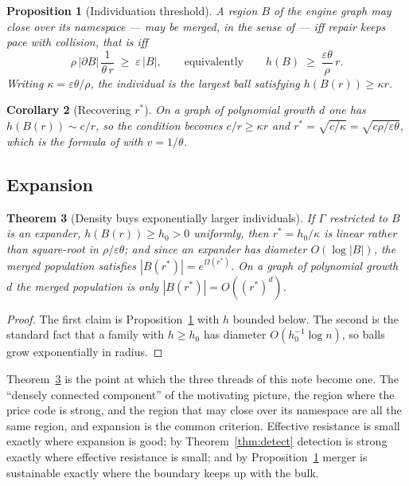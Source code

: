 \documentclass[11pt]{article}
\theoremstyle{plain}
\newtheorem{theorem}{Theorem}[section]
\newtheorem{proposition}[theorem]{Proposition}
\newtheorem{corollary}[theorem]{Corollary}
\theoremstyle{definition}
\theoremstyle{remark}
\begin{document}
\begin{proposition}[Individuation threshold]\label{prop:indiv}
A region $B$ of the engine graph may close over its namespace --- may be
merged, in the sense of \cite[\S8]{compose} --- iff repair keeps pace with
collision, that is iff
\[
  \rho\,|\partial B|\,\frac{1}{\theta\,r} \;\geq\; \varepsilon\,|B|,
  \qquad\text{equivalently}\qquad
  h(B) \;\geq\; \frac{\varepsilon\theta}{\rho}\, r .
\]
Writing $\kappa = \varepsilon\theta/\rho$, the individual is the largest
ball satisfying $h(B(r)) \geq \kappa r$.
\end{proposition}

\begin{corollary}[Recovering $r^\ast$]
On a graph of polynomial growth $d$ one has $h(B(r)) \sim c/r$, so the
condition becomes $c/r \geq \kappa r$ and
$r^\ast = \sqrt{c/\kappa} = \sqrt{c\rho/\varepsilon\theta}$, which is the
formula of \cite{compaut} with $v = 1/\theta$.
\end{corollary}

\subsection{Expansion}

\begin{theorem}[Density buys exponentially larger individuals]
\label{thm:expander}
If $\Gamma$ restricted to $B$ is an expander, $h(B(r)) \geq h_0 > 0$
uniformly, then $r^\ast = h_0/\kappa$ is linear rather than square-root in
$\rho/\varepsilon\theta$; and since an expander has diameter
$O(\log|B|)$, the merged population satisfies
$|B(r^\ast)| = e^{\Omega(r^\ast)}$. On a graph of polynomial growth $d$ the
merged population is only $|B(r^\ast)| = O((r^\ast)^d)$.
\end{theorem}

\begin{proof}
The first claim is Proposition~\ref{prop:indiv} with $h$ bounded below.
The second is the standard fact that a family with $h \geq h_0$ has
diameter $O(h_0^{-1}\log n)$, so balls grow exponentially in radius.
\end{proof}

Theorem~\ref{thm:expander} is the point at which the three threads of this
note become one. The ``densely connected component'' of the motivating
picture, the region where the price code is strong, and the region that may
close over its namespace are all the same region, and expansion is the
common criterion. Effective resistance is small exactly where expansion is
good; by Theorem~\ref{thm:detect} detection is strong exactly where
effective resistance is small; and by Proposition~\ref{prop:indiv} merger
is sustainable exactly where the boundary keeps up with the bulk.
\end{document}
